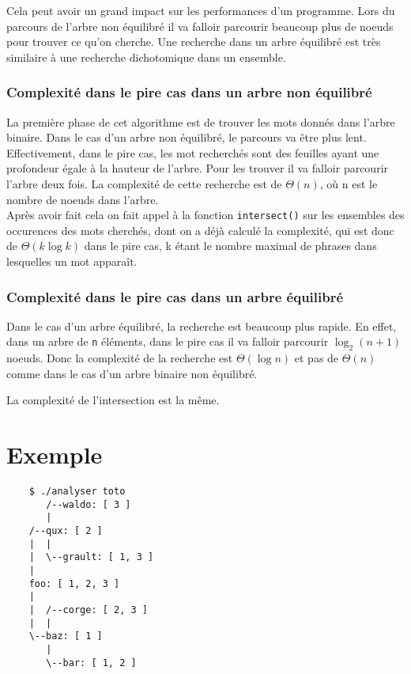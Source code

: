 \documentclass[11pt]{article}
\begin{document}
        Cela peut avoir un grand impact sur les performances d'un programme.
        Lors du parcours de l'arbre non équilibré il va falloir parcourir beaucoup
        plus de noeuds pour trouver ce qu'on cherche. Une recherche dans un arbre
        équilibré est très similaire à une recherche dichotomique dans un ensemble.


        \subsubsection{Complexité dans le pire cas dans un arbre non équilibré}
        La première phase de cet algorithme est de trouver les mots donnés dans
        l'arbre binaire. Dans le cas d'un arbre non équilibré, le parcours va être
        plus lent. Effectivement, dans le pire cas, les mot recherchés sont des
        feuilles ayant une profondeur égale à la hauteur de l'arbre. Pour les
        trouver il va falloir parcourir l'arbre deux fois. La complexité de
        cette recherche est de $\Theta(n)$, où n est le nombre de noeuds dans
        l'arbre.\\

        Après avoir fait cela on fait appel à la fonction \texttt{intersect()}
        sur les ensembles des occurences des mots cherchés, dont on a déjà
        calculé la complexité, qui est donc de $\Theta(k\log{}k)$ dans le pire cas,
        k étant le nombre maximal de phrases dans lesquelles un mot apparaît.

        \subsubsection{Complexité dans le pire cas dans un arbre équilibré}
        Dans le cas d'un arbre équilibré, la recherche est beaucoup plus rapide.
        En effet, dans un arbre de \texttt{n} éléments, dans le pire cas il va falloir
        parcourir ${\log_2(n+1)}$ noeuds. Donc la complexité de la recherche
        est $\Theta(\log{}n)$ et pas de $\Theta(n)$ comme dans le cas d'un arbre
        binaire non équilibré.

        La complexité de l'intersection est la même.


    \section{Exemple}

    \begin{verbatim}
    $ ./analyser toto
       /--waldo: [ 3 ]
       |
    /--qux: [ 2 ]
    |  |
    |  \--grault: [ 1, 3 ]
    |
    foo: [ 1, 2, 3 ]
    |
    |  /--corge: [ 2, 3 ]
    |  |
    \--baz: [ 1 ]
       |
       \--bar: [ 1, 2 ]
    \end{verbatim}
\end{document}

